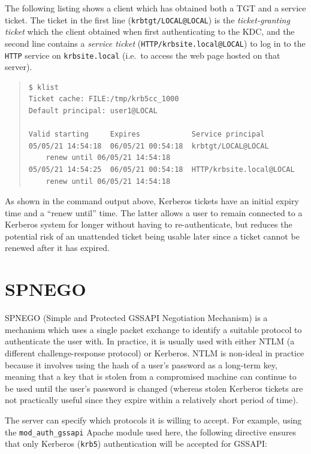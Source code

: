 \documentclass[12pt]{report}
\begin{document}
The following listing shows a client which has obtained both a TGT and a service ticket. The ticket in the first line (\verb+krbtgt/LOCAL@LOCAL+) is the \textit{ticket-granting ticket} which the client obtained when first authenticating to the KDC, and the second line contains a \textit{service ticket} (\verb+HTTP/krbsite.local@LOCAL+) to log in to the \verb+HTTP+ service on \verb+krbsite.local+ (i.e.\ to access the web page hosted on that server).

\begin{quote}
\begin{verbatim}
$ klist
Ticket cache: FILE:/tmp/krb5cc_1000
Default principal: user1@LOCAL

Valid starting     Expires            Service principal
05/05/21 14:54:18  06/05/21 00:54:18  krbtgt/LOCAL@LOCAL
	renew until 06/05/21 14:54:18
05/05/21 14:54:25  06/05/21 00:54:18  HTTP/krbsite.local@LOCAL
	renew until 06/05/21 14:54:18
\end{verbatim}
\end{quote}

As shown in the command output above, Kerberos tickets have an initial expiry time and a ``renew until'' time. The latter allows a user to remain connected to a Kerberos system for longer without having to re-authenticate, but reduces the potential risk of an unattended ticket being usable later since a ticket cannot be renewed after it has expired.

\section{SPNEGO}
SPNEGO (Simple and Protected GSSAPI Negotiation Mechanism) is a mechanism which uses a single packet exchange to identify a suitable protocol to authenticate the user with. In practice, it is usually used with either NTLM (a different challenge-response protocol) or Kerberos. NTLM is non-ideal in practice because it involves using the hash of a user's password as a long-term key, meaning that a key that is stolen from a compromised machine can continue to be used until the user's password is changed (whereas stolen Kerberos tickets are not practically useful since they expire within a relatively short period of time).

The server can specify which protocols it is willing to accept. For example, using the \verb+mod_auth_gssapi+ Apache module used here, the following directive ensures that only Kerberos (\texttt{krb5}) authentication will be accepted for GSSAPI:
\end{document}
